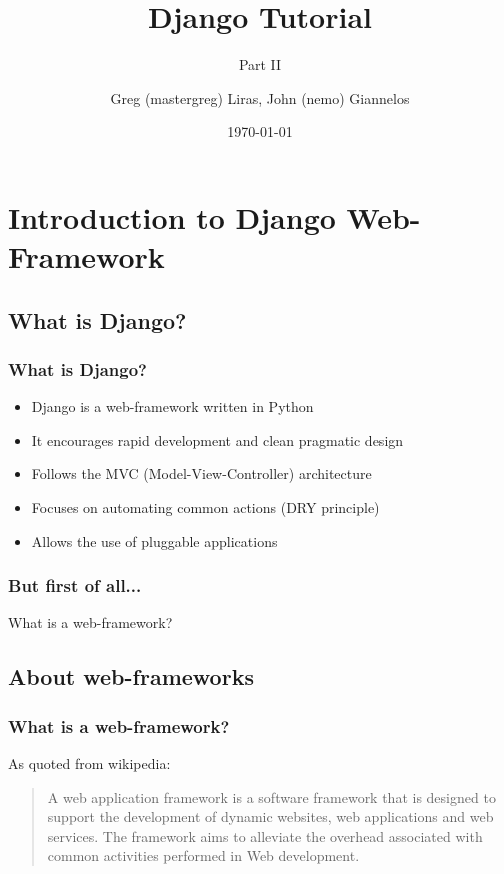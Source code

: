 \documentclass{beamer}
\author[nemo,mastergreg]{Greg (mastergreg) Liras, John (nemo) Giannelos}
\institute{foss.ntua}
\title{Django Tutorial}
\subtitle{Part II}
\date{\today}
\begin{document}
\begin{frame}
\titlepage
\end{frame}


\section{Introduction to Django Web-Framework}

\subsection{What is Django?}
\begin{frame}
  \frametitle{What is Django?}
\begin{itemize}[<+->]
  \item Django is a web-framework written in Python 
  \item It encourages rapid development and clean pragmatic design 
  \item Follows the MVC (Model-View-Controller) architecture
  \item Focuses on automating common actions (DRY principle) 
  \item Allows the use of pluggable applications
\end{itemize}
\end{frame}

\begin{frame}
  \frametitle{But first of all...}
What is a web-framework?
\end{frame}

\subsection{About web-frameworks}

\begin{frame}
  \frametitle{What is a web-framework?}
As quoted from wikipedia:
\begin{quote}
A web application framework is a software framework that is designed to support the development of dynamic websites, web applications and web services. The framework aims to alleviate the overhead associated with common activities performed in Web development.
\end{quote}
\end{frame}
\end{document}

